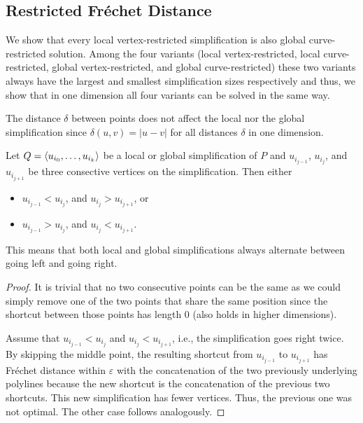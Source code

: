 \subsection{Restricted Fréchet Distance}
We show that every local vertex-restricted simplification is also global curve-restricted solution. Among the four variants (local vertex-restricted, local curve-restricted, global vertex-restricted, and global curve-restricted) these two variants always have the largest and smallest simplification sizes respectively and thus, we show that in one dimension all four variants can be solved in the same way.

\begin{observation}
  The distance \(\delta\) between points does not affect the local nor the global simplification since \(\delta(u, v) = |u-v|\) for all distances \(\delta\) in one dimension.
\end{observation}

\begin{lemma}[Zigzag]\label{lem:zigzag}
  Let \(Q = \left\langle u_{i_0}, \dots, u_{i_k}\right\rangle\) be a local or global simplification of \(P\) and \(u_{i_{j-1}}\), \(u_{i_{j}}\), and \(u_{i_{j+1}}\) be three consective vertices on the simplification. Then either
	\begin{itemize}
	  \item \(u_{i_{j-1}} < u_{i_{j}}\), and \(u_{i_{j}} > u_{i_{j+1}}\), or 
	  \item \(u_{i_{j-1}} > u_{i_{j}}\), and \(u_{i_{j}} < u_{i_{j+1}}\).
	\end{itemize}

	This means that both local and global simplifications always alternate between going left and going right.
\end{lemma}

\begin{proof}
  It is trivial that no two consecutive points can be the same as we could simply remove one of the two points that share the same position since the shortcut between those points has length 0 (also holds in higher dimensions). 

	Assume that \(u_{i_{j-1}} < u_{i_{j}}\) and \(u_{i_{j}} < u_{i_{j+1}}\), i.e., the simplification goes right twice. By skipping the middle point, the resulting shortcut from \(u_{i_{j-1}}\) to \(u_{i_{j+1}}\) has Fréchet distance within \(\varepsilon\) with the concatenation of the two previously underlying polylines because the new shortcut is the concatenation of the previous two shortcuts. This new simplification has fewer vertices. Thus, the previous one was not optimal. The other case follows analogously. 
\end{proof}

